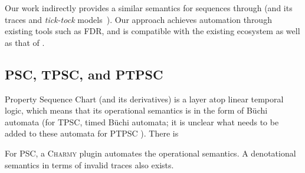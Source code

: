 Our work indirectly provides a similar semantics for \langname{}
sequences through \tockcsp{} (and its traces and \emph{tick-tock} models~\cite{Baxter21-TickTock}).
Our approach achieves automation through existing tools such as FDR,
and is compatible with the existing \robostar{} ecosystem as well as that of
\tockcsp.

\subsection{PSC, TPSC, and PTPSC}

Property Sequence Chart (and its derivatives) is a layer atop
linear temporal logic, which means that its operational semantics is
in the form of B\"uchi automata (for TPSC, timed B\"uchi
automata; it is unclear what needs to be added to these automata for PTPSC ).
There is 

For PSC, a \textsc{Charmy} plugin automates the operational semantics.  A denotational semantics in terms of
invalid traces also exists.